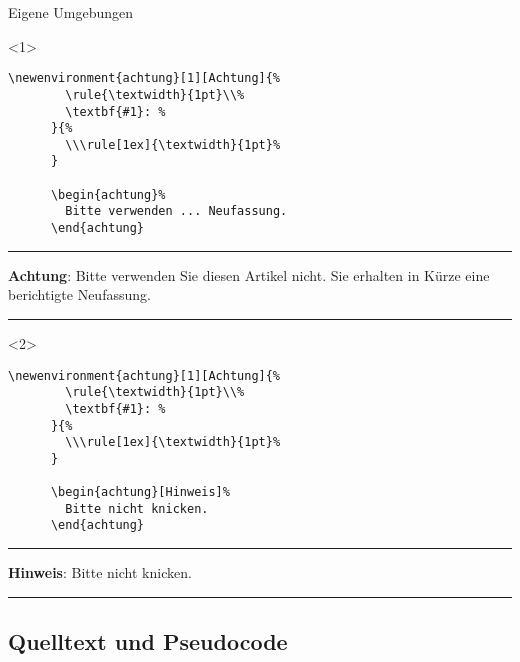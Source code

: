 \begin{Frame}[fragile,t]{Eigene Umgebungen}
  \newenvironment{achtung}[1][Achtung]{%
    \rule{\textwidth}{1pt}\newline%
    \textbf{#1}: %
  }{%
    \newline\rule[1ex]{\textwidth}{1pt}%
  }

  \begin{onlyenv}<1>
    \begin{lstlisting}[gobble=6,morekeywords={[2]achtung}]
      \newenvironment{achtung}[1][Achtung]{%
        \rule{\textwidth}{1pt}\\%
        \textbf{#1}: %
      }{%
        \\\rule[1ex]{\textwidth}{1pt}%
      }

      \begin{achtung}%
        Bitte verwenden ... Neufassung.
      \end{achtung}
    \end{lstlisting}

    \begin{achtung}%
      Bitte verwenden Sie diesen Artikel nicht.
      Sie erhalten in Kürze eine berichtigte Neufassung.
    \end{achtung}
  \end{onlyenv}

  \begin{onlyenv}<2>
    \begin{lstlisting}[gobble=6,morekeywords={[2]achtung}]
      \newenvironment{achtung}[1][Achtung]{%
        \rule{\textwidth}{1pt}\\%
        \textbf{#1}: %
      }{%
        \\\rule[1ex]{\textwidth}{1pt}%
      }

      \begin{achtung}[Hinweis]%
        Bitte nicht knicken.
      \end{achtung}
    \end{lstlisting}

    \begin{achtung}[Hinweis]%
      Bitte nicht knicken.
    \end{achtung}
  \end{onlyenv}
\end{Frame}

\subsection{Quelltext und Pseudocode}

